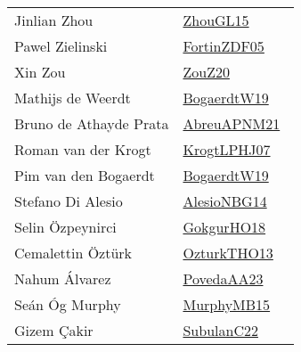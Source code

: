 {\begin{longtable}{p{4cm}p{20cm}}
Jinlian Zhou & \href{works/ZhouGL15.pdf}{ZhouGL15}~\cite{ZhouGL15}\\
Pawel Zielinski & \href{works/FortinZDF05.pdf}{FortinZDF05}~\cite{FortinZDF05}\\
Xin Zou & \href{works/ZouZ20.pdf}{ZouZ20}~\cite{ZouZ20}\\
Mathijs de Weerdt & \href{works/BogaerdtW19.pdf}{BogaerdtW19}~\cite{BogaerdtW19}\\
Bruno de Athayde Prata & \href{works/AbreuAPNM21.pdf}{AbreuAPNM21}~\cite{AbreuAPNM21}\\
Roman van der Krogt & \href{works/KrogtLPHJ07.pdf}{KrogtLPHJ07}~\cite{KrogtLPHJ07}\\
Pim van den Bogaerdt & \href{works/BogaerdtW19.pdf}{BogaerdtW19}~\cite{BogaerdtW19}\\
Stefano {Di Alesio} & \href{works/AlesioNBG14.pdf}{AlesioNBG14}~\cite{AlesioNBG14}\\
Selin {\"{O}}zpeynirci & \href{works/GokgurHO18.pdf}{GokgurHO18}~\cite{GokgurHO18}\\
Cemalettin {\"{O}}zt{\"{u}}rk & \href{works/OzturkTHO13.pdf}{OzturkTHO13}~\cite{OzturkTHO13}\\
Nahum {\'{A}}lvarez & \href{works/PovedaAA23.pdf}{PovedaAA23}~\cite{PovedaAA23}\\
Se{\'{a}}n {\'{O}}g Murphy & \href{works/MurphyMB15.pdf}{MurphyMB15}~\cite{MurphyMB15}\\
Gizem {\c{C}}akir & \href{works/SubulanC22.pdf}{SubulanC22}~\cite{SubulanC22}\\
\end{longtable}
}

